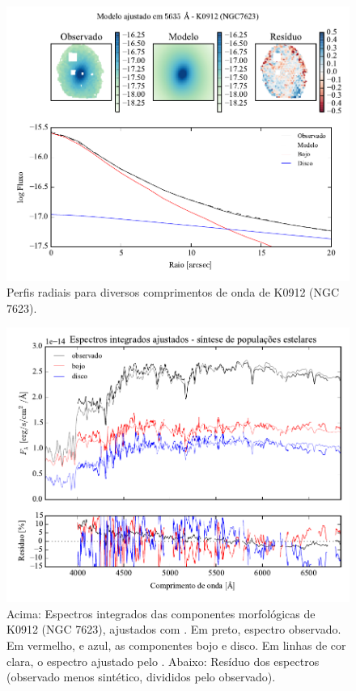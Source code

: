 \begin{figure}
	\includegraphics[page=5]{figuras-decomp/K0912_sample006a}
	\caption[Perfis radiais para diversos comprimentos de onda de K0912 (NGC 7623)]
	{Perfis radiais para diversos comprimentos de onda de K0912 (NGC 7623).}
	\label{fig:decompRadprofSpec:K0912}
\end{figure}

\begin{figure}
	\includegraphics[page=17,width=\textwidth]{figuras/sample006a_synthesis}
	\caption[Espectros ajustados com \starlight das componentes morfológicas de
	K0912 (NGC 7623)]
	{Acima: Espectros integrados das componentes morfológicas de
	K0912 (NGC 7623), ajustados com \starlight. Em preto, espectro observado. Em
	vermelho, e azul, as componentes bojo e disco. Em linhas de cor clara, o
	espectro ajustado pelo \starlight. Abaixo: Resíduo dos espectros (observado
	menos sintético, divididos pelo observado).}
	\label{fig:decompSintese:K0912}
\end{figure}

